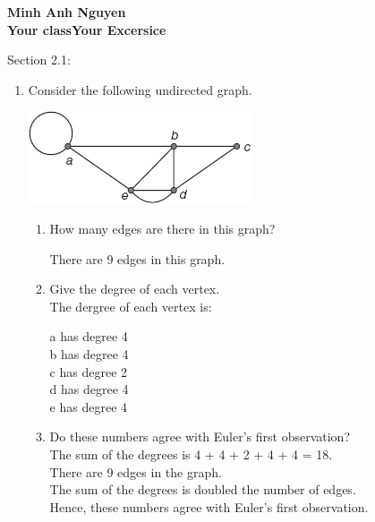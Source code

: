 \documentclass[12pt]{article}
\begin{document}
\textbf{Minh Anh Nguyen }\\
\textbf{Your class\hfill Your Excersice}

\hrulefill

Section 2.1:

\begin{enumerate}
  \item Consider the following undirected graph.
  \begin{center}
    \includegraphics{img/img-0.png}
  \end{center}
  
        \begin{enumerate}
          \item How many edges are there in this graph?
          \begin{center}
            There are 9 edges in this graph.
          \end{center}
          
        
          \item Give the degree of each vertex.\\
          The dergree of each vertex is:
          \begin{center}
            a has degree 4\\
            b has degree 4\\
            c has degree 2\\
            d has degree 4\\
            e has degree 4\\
          \end{center}

          \item Do these numbers agree with Euler’s first observation? \\
          The sum of the degrees is 4 + 4 + 2 + 4 + 4 = 18. \\
          There are 9 edges in the graph. \\
          The sum of the degrees is doubled the number of edges.\\
          Hence, these numbers agree with Euler's first observation.
        \end{enumerate}


\end{enumerate}
\end{document}

